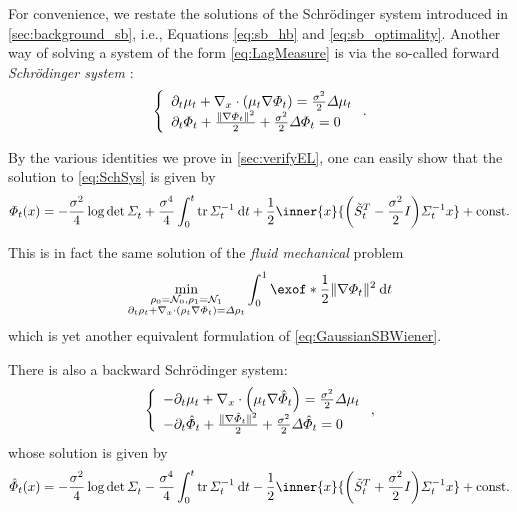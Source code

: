 For convenience, we restate the solutions of the Schr\"odinger system introduced in \cref{sec:background_sb}, i.e., Equations \eqref{eq:sb_hb} and \eqref{eq:sb_optimality}.
Another way of solving a system of the form \eqref{eq:LagMeasure} is via the so-called forward \emph{Schr\"odinger system} \citep{chen2021stochastic, leonard2013survey}:
\begin{align}
\label{eq:SchSys}
\left\{\begin{array}{lr}
\del_t \mu_t +\Div\parens*{  \mu_t\nabla \pot } = \frac{\sdev^2}{2}  \Laplace\mu_t \\
       \del_t \pot + \frac{\norm{ \nabla\pot}^2}{2} + \frac{\sdev^2}{2} \Laplace \pot = 0
        \end{array}\right..
\end{align}

By the various identities we prove in \cref{sec:verifyEL}, one can easily show that the solution to \eqref{eq:SchSys} is given by
\begin{align}
\pot(\point) = - \frac{\sdev^2}{4} \log\det\Sigmasol + \frac{\sdev^4}{4}  \int_{0}^t \tr \Sigmasolinv \dt + \frac{1}{2} \inner{\point}{\parens*{\Ht^T - \frac{\sdev^2}{2}\eye}\Sigmasolinv \point} + \const
\end{align}

This is in fact the same solution of the \emph{fluid mechanical} problem
\begin{align}
\min_{\ssstyle\substack{{\measure[0] = \Ninit, \measure[\horizon] = \Nend} \\ {\pt\measure +\Div(\measure \vecsol) =\Laplace \measure }}} \int_{0}^\horizon  \exof*{\frac{1}{2} \norm{\vecsol}^2 } \dt
\end{align}which is yet another equivalent formulation of \eqref{eq:GaussianSBWiener}.

There is also a backward Schr\"odinger system:
\begin{align}
\left\{\begin{array}{lr}
-\del_t \mu_t + \Div\parens*{  \mu_t\nabla \rpot } =\frac{\sdev^2}{2}  \Laplace\mu_t  \\
      - \del_t \rpot + \frac{\norm{ \nabla\rpot}^2}{2} +\frac{\sdev^2}{2} \Laplace \rpot = 0
        \end{array}\right.,
\end{align}
whose solution is given by
\begin{align}
\rpot(\point) = - \frac{\sdev^2}{4} \log\det\Sigmasol - \frac{\sdev^4}{4}  \int_{0}^t \tr \Sigmasolinv \dt - \frac{1}{2} \inner{\point}{ \parens*{\Ht^T +\frac{\sdev^2}{2}\eye}\Sigmasolinv \point} + \const
\end{align}

